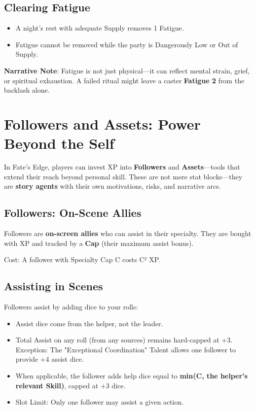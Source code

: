 \subsection*{Clearing Fatigue}

\begin{itemize}
    \item A night's rest with adequate Supply removes 1 Fatigue.
    \item Fatigue cannot be removed while the party is Dangerously Low or Out of Supply.
\end{itemize}

\textbf{Narrative Note}: Fatigue is not just physical—it can reflect mental strain, grief, or spiritual exhaustion. A failed ritual might leave a caster \textbf{Fatigue 2} from the backlash alone.

\section*{Followers and Assets: Power Beyond the Self}

In Fate's Edge, players can invest XP into \textbf{Followers} and \textbf{Assets}—tools that extend their reach beyond personal skill. These are not mere stat blocks—they are \textbf{story agents} with their own motivations, risks, and narrative arcs.

\subsection*{Followers: On-Scene Allies}

Followers are \textbf{on-screen allies} who can assist in their specialty. They are bought with XP and tracked by a \textbf{Cap} (their maximum assist bonus).

Cost: A follower with Specialty Cap C costs C² XP.

\subsection*{Assisting in Scenes}

Followers assist by adding dice to your rolls:

\begin{itemize}
    \item Assist dice come from the helper, not the leader.
    \item Total Assist on any roll (from any sources) remains hard-capped at +3. Exception: The "Exceptional Coordination" Talent allows one follower to provide +4 assist dice.
    \item When applicable, the follower adds help dice equal to \textbf{min(C, the helper's relevant Skill)}, capped at +3 dice.
    \item Slot Limit: Only one follower may assist a given action.
\end{itemize}

